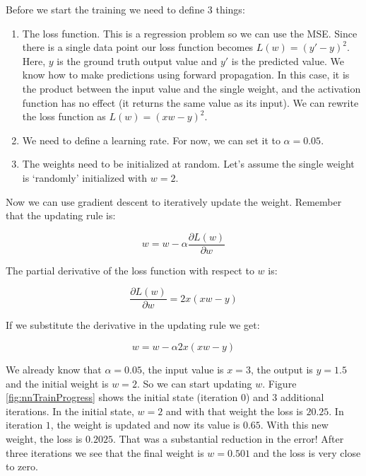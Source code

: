 \documentclass[
  11pt,
]{krantz}
\begin{document}
Before we start the training we need to define \(3\) things:

\begin{enumerate}
\def\labelenumi{\arabic{enumi}.}
\item
  The loss function. This is a regression problem so we can use the MSE. Since there is a single data point our loss function becomes \(L(w)=(y' - y)^2\). Here, \(y\) is the ground truth output value and \(y'\) is the predicted value. We know how to make predictions using forward propagation. In this case, it is the product between the input value and the single weight, and the activation function has no effect (it returns the same value as its input). We can rewrite the loss function as \(L(w)=(xw - y)^2\).
\item
  We need to define a learning rate. For now, we can set it to \(\alpha = 0.05\).
\item
  The weights need to be initialized at random. Let's assume the single weight is `randomly' initialized with \(w=2\).
\end{enumerate}

Now we can use gradient descent to iteratively update the weight. Remember that the updating rule is:

\begin{equation}
  w = w - \alpha \frac{\partial L(w)}{\partial w}
\end{equation}

The partial derivative of the loss function with respect to \(w\) is:

\begin{equation}
  \frac{\partial L(w)}{\partial w} = 2x(xw - y)
\end{equation}

If we substitute the derivative in the updating rule we get:

\begin{equation}
  w = w - \alpha 2x(xw - y)
\end{equation}

We already know that \(\alpha=0.05\), the input value is \(x=3\), the output is \(y=1.5\) and the initial weight is \(w=2\). So we can start updating \(w\). Figure \ref{fig:nnTrainProgress} shows the initial state (iteration 0) and \(3\) additional iterations. In the initial state, \(w=2\) and with that weight the loss is \(20.25\). In iteration \(1\), the weight is updated and now its value is \(0.65\). With this new weight, the loss is \(0.2025\). That was a substantial reduction in the error! After three iterations we see that the final weight is \(w=0.501\) and the loss is very close to zero.
\end{document}
